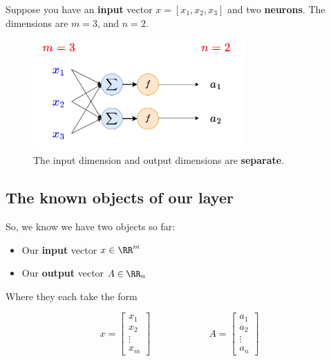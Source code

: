         \miniex Suppose you have an \textbf{input} vector $x=[x_1, x_2, x_3]$ and two \textbf{neurons}. The dimensions are $m=3$, and $n=2$.
    
        \begin{figure}[H]
            \centering
            \includegraphics[width=80mm,scale=0.4]{images/nn_images/dimensions_network.png}
            \caption*{The input dimension and output dimensions are \textbf{separate}.}
        \end{figure}
        
    \subsection{The known objects of our layer}
    
        So, we know we have two objects so far:
        
        \begin{itemize}
            \item Our \textbf{input} vector $x \in \RR^m$
            
            \item Our \textbf{output} vector $A \in \RR_n$

        \end{itemize}
        
        Where they each take the form
        
        \begin{equation}
            x = 
                \begin{bmatrix}
                  x_1\\x_2\\ \vdots \\ x_m
                \end{bmatrix}
            \qquad \qquad \qquad
            A =
            \begin{bmatrix}
                a_1\\a_2\\ \vdots \\ a_n
            \end{bmatrix}
        \end{equation}
        
